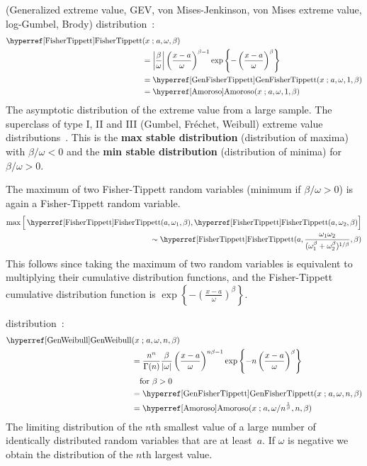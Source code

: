 
 (Generalized extreme value, GEV, von Mises-Jenkinson, von Mises extreme value, log-Gumbel, Brody) distribution~\cite{Fisher1928, Mises1936, Gumbel1958,Johnson1995,McFadden1978a}:
\begin{align}
\label{FisherTippett}
\opr{FisherTippett}&(x\given  a , \omega, \beta) 
\\ \notag
&=
\left|\frac{\beta}{\omega}\right|
\left(\frac{x-a}{\omega}\right)^{ \beta -1}
\exp \left\{
-  \left(\frac{x-a}{\omega}\right)^{\beta} 
\right\} \checked
\\ \notag & = \opr{GenFisherTippett}(x\given a, \omega, 1, \beta) \checked
\\ \notag & = \opr{Amoroso}(x\given a, \omega, 1, \beta) \checked
\end{align}
The asymptotic distribution of the extreme value from a large sample. The superclass of type I, II and III (Gumbel, Fr\'{e}chet, Weibull) extreme value distributions~\cite{Mises1936}.  This is the {\bf max stable distribution} (distribution of maxima) with $\beta/\omega<0$ and the {\bf min stable distribution}  (distribution of minima) for $\beta/\omega>0$.


The maximum of two Fisher-Tippett random variables (minimum if $\beta/\omega>0$)  is again a Fisher-Tippett random variable. 
\begin{align*}
\max\Big[ \opr{FisherTippett}(a,\omega_1,\beta),  \opr{FisherTippett}(a, \omega_2,\beta)  \Big]&\\  \sim 
 \opr{FisherTippett}(a, \frac{\omega_1 \omega_2}{(\omega_1^{\beta} + \omega_2^{\beta} )^{1/\beta}},\beta) \checked
\end{align*}
This follows since taking the maximum of two random variables is equivalent to multiplying their cumulative distribution functions, and the Fisher-Tippett cumulative distribution function is $\exp \left\{
-  \left(\frac{x-a}{\omega}\right)^{\beta}
\right\}$.



 distribution~\cite{Smirnov1949,Barndorff-Nielsen1963}:
\begin{align}
\label{GenWeibull}
\opr{GenWeibull}&(x \given a , \omega, n, \beta) 
\\ \notag &=	\frac{n^n}{\Gamma(n)}  \frac{ \beta}{| \omega |} \left(\frac{x-a }{\omega}\right)^{n \beta-1} \exp\left\{-n \left(\frac{x-a }{\omega}\right)^{ \beta}\right\} 
\\ \notag &\quad \text{for } \beta>0 
\\ \notag & = \opr{GenFisherTippett}(x\given a, \omega, n, \beta) \checked
\\ \notag
&= \opr{Amoroso}(x\given  a , {\omega}/{n^{\frac{1}{\beta} }}, n, \beta)  \checked
\end{align}
The limiting distribution of the $n$th smallest value of a large number of  identically distributed random variables that are at least~$a$. 
If $\omega$ is negative we obtain the distribution of the $n$th largest value.




